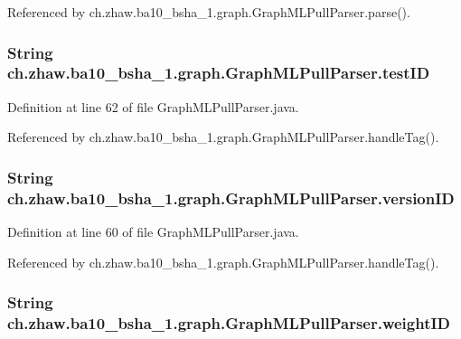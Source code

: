 Referenced by ch.zhaw.ba10\_\-bsha\_\-1.graph.GraphMLPullParser.parse().\hypertarget{classch_1_1zhaw_1_1ba10__bsha__1_1_1graph_1_1GraphMLPullParser_a79c09f5a53d75b35da0f609cc4290f2a}{
\subsubsection[{testID}]{\setlength{\rightskip}{0pt plus 5cm}String {\bf ch.zhaw.ba10\_\-bsha\_\-1.graph.GraphMLPullParser.testID}}}
\label{classch_1_1zhaw_1_1ba10__bsha__1_1_1graph_1_1GraphMLPullParser_a79c09f5a53d75b35da0f609cc4290f2a}


Definition at line 62 of file GraphMLPullParser.java.

Referenced by ch.zhaw.ba10\_\-bsha\_\-1.graph.GraphMLPullParser.handleTag().\hypertarget{classch_1_1zhaw_1_1ba10__bsha__1_1_1graph_1_1GraphMLPullParser_acea5e4293f4be63dd51ba0615f2c79e6}{
\subsubsection[{versionID}]{\setlength{\rightskip}{0pt plus 5cm}String {\bf ch.zhaw.ba10\_\-bsha\_\-1.graph.GraphMLPullParser.versionID}}}
\label{classch_1_1zhaw_1_1ba10__bsha__1_1_1graph_1_1GraphMLPullParser_acea5e4293f4be63dd51ba0615f2c79e6}


Definition at line 60 of file GraphMLPullParser.java.

Referenced by ch.zhaw.ba10\_\-bsha\_\-1.graph.GraphMLPullParser.handleTag().\hypertarget{classch_1_1zhaw_1_1ba10__bsha__1_1_1graph_1_1GraphMLPullParser_a2e9f39fce4b5b75c5608490acb5de29c}{
\subsubsection[{weightID}]{\setlength{\rightskip}{0pt plus 5cm}String {\bf ch.zhaw.ba10\_\-bsha\_\-1.graph.GraphMLPullParser.weightID}}}
\label{classch_1_1zhaw_1_1ba10__bsha__1_1_1graph_1_1GraphMLPullParser_a2e9f39fce4b5b75c5608490acb5de29c}


